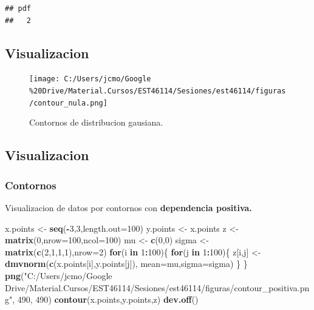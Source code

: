 \documentclass[11pt,]{article}
\newenvironment{Shaded}{\begin{snugshade}}{\end{snugshade}}
\newcommand{\KeywordTok}[1]{\textcolor[rgb]{0.13,0.29,0.53}{\textbf{#1}}}
\newcommand{\DataTypeTok}[1]{\textcolor[rgb]{0.13,0.29,0.53}{#1}}
\newcommand{\DecValTok}[1]{\textcolor[rgb]{0.00,0.00,0.81}{#1}}
\newcommand{\StringTok}[1]{\textcolor[rgb]{0.31,0.60,0.02}{#1}}
\newcommand{\ControlFlowTok}[1]{\textcolor[rgb]{0.13,0.29,0.53}{\textbf{#1}}}
\newcommand{\OperatorTok}[1]{\textcolor[rgb]{0.81,0.36,0.00}{\textbf{#1}}}
\newcommand{\NormalTok}[1]{#1}
\begin{document}
\begin{verbatim}
## pdf 
##   2
\end{verbatim}

\subsection{Visualizacion}\label{visualizacion-2}

\begin{figure}
\centering
\texttt{[image: C:/Users/jcmo/Google\\\%20Drive/Material.Cursos/EST46114/Sesiones/est46114/figuras/contour\_nula.png]}
\caption{Contornos de distribucion gausiana.}
\end{figure}

\subsection{Visualizacion}\label{visualizacion-3}

\subsubsection{Contornos}\label{contornos-2}

Visualizacion de datos por contornos con \textbf{dependencia positiva.}

\begin{Shaded}
\begin{Highlighting}[]
\NormalTok{x.points <-}\StringTok{ }\KeywordTok{seq}\NormalTok{(}\OperatorTok{-}\DecValTok{3}\NormalTok{,}\DecValTok{3}\NormalTok{,}\DataTypeTok{length.out=}\DecValTok{100}\NormalTok{)}
\NormalTok{y.points <-}\StringTok{ }\NormalTok{x.points}
\NormalTok{z <-}\StringTok{ }\KeywordTok{matrix}\NormalTok{(}\DecValTok{0}\NormalTok{,}\DataTypeTok{nrow=}\DecValTok{100}\NormalTok{,}\DataTypeTok{ncol=}\DecValTok{100}\NormalTok{)}
\NormalTok{mu <-}\StringTok{ }\KeywordTok{c}\NormalTok{(}\DecValTok{0}\NormalTok{,}\DecValTok{0}\NormalTok{)}
\NormalTok{sigma <-}\StringTok{ }\KeywordTok{matrix}\NormalTok{(}\KeywordTok{c}\NormalTok{(}\DecValTok{2}\NormalTok{,}\DecValTok{1}\NormalTok{,}\DecValTok{1}\NormalTok{,}\DecValTok{1}\NormalTok{),}\DataTypeTok{nrow=}\DecValTok{2}\NormalTok{)}
\ControlFlowTok{for}\NormalTok{(i }\ControlFlowTok{in} \DecValTok{1}\OperatorTok{:}\DecValTok{100}\NormalTok{)\{}
  \ControlFlowTok{for}\NormalTok{(j }\ControlFlowTok{in} \DecValTok{1}\OperatorTok{:}\DecValTok{100}\NormalTok{)\{}
\NormalTok{    z[i,j] <-}\StringTok{ }\KeywordTok{dmvnorm}\NormalTok{(}\KeywordTok{c}\NormalTok{(x.points[i],y.points[j]),}
                      \DataTypeTok{mean=}\NormalTok{mu,}\DataTypeTok{sigma=}\NormalTok{sigma)}
\NormalTok{    \}}
\NormalTok{\}}
\KeywordTok{png}\NormalTok{(}\StringTok{"C:/Users/jcmo/Google Drive/Material.Cursos/EST46114/Sesiones/est46114/figuras/contour_positiva.png"}\NormalTok{, }\DecValTok{490}\NormalTok{, }\DecValTok{490}\NormalTok{)}
\KeywordTok{contour}\NormalTok{(x.points,y.points,z)}
\KeywordTok{dev.off}\NormalTok{()}
\end{Highlighting}
\end{Shaded}
\end{document}
